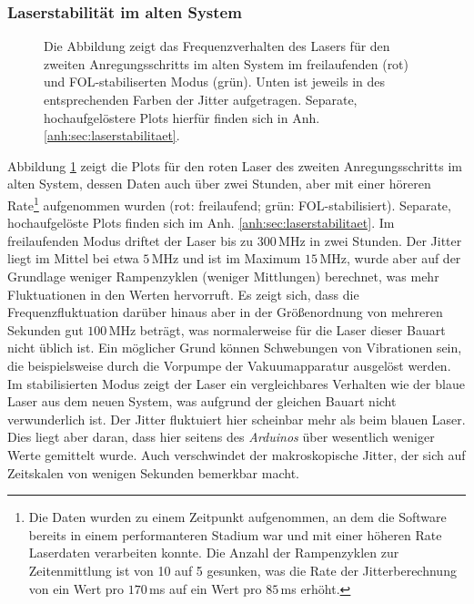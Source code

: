 \subsubsection{Laserstabilität im alten
System}\label{subsubsec:stabilitaetsmessungen_software_altes_system}
\begin{figure}[h]
 	\centering
 	\footnotesize
	
	\caption[Laserfrequenzverhalten altes System]{Die Abbildung zeigt das
	Frequenzverhalten des Lasers für den zweiten Anregungsschritts im alten System
	im freilaufenden (rot) und FOL-stabiliserten Modus (grün).
	Unten ist jeweils in des entsprechenden Farben der Jitter aufgetragen.
	Separate, hochaufgelöstere Plots hierfür finden sich in Anh.
	\ref{anh:sec:laserstabilitaet}.}
	\label{fig:laserstabilitaet_alt_alles}
\end{figure}
Abbildung \ref{fig:laserstabilitaet_alt_alles} zeigt die Plots für den
roten Laser des zweiten Anregungsschritts im alten System, dessen Daten auch
über zwei Stunden, aber mit einer höreren Rate\footnote{Die Daten wurden zu
einem Zeitpunkt aufgenommen, an dem die Software bereits in einem performanteren
Stadium war und mit einer höheren Rate Laserdaten verarbeiten konnte. Die Anzahl
der Rampenzyklen zur Zeitenmittlung ist von 10 auf 5 gesunken, was die Rate
der Jitterberechnung von ein Wert pro $170\,$ms auf ein Wert pro $85\,$ms
erhöht.} aufgenommen wurden (rot:
freilaufend; grün:
FOL-stabilisiert).
Separate, hochaufgelöste Plots finden sich im Anh.
\ref{anh:sec:laserstabilitaet}. Im freilaufenden Modus driftet der Laser bis
zu $300\,$MHz in zwei Stunden. Der Jitter liegt im Mittel bei etwa $5\,$MHz und
ist im Maximum $15\,$MHz, wurde aber auf der Grundlage weniger Rampenzyklen
(weniger Mittlungen) berechnet, was mehr Fluktuationen in den Werten hervorruft.
Es zeigt sich, dass die Frequenzfluktuation darüber hinaus aber in der Größenordnung von mehreren Sekunden gut $100\,$MHz beträgt, was normalerweise für die Laser dieser Bauart
nicht üblich ist. Ein möglicher Grund können Schwebungen von Vibrationen sein,
die beispielsweise durch die Vorpumpe der Vakuumapparatur ausgelöst werden. Im
stabilisierten Modus zeigt der Laser ein vergleichbares Verhalten wie der blaue
Laser aus dem neuen System, was aufgrund der gleichen Bauart nicht verwunderlich ist. Der Jitter fluktuiert hier scheinbar mehr als beim blauen
Laser. Dies liegt aber daran, dass hier seitens des \textit{Arduinos} über
wesentlich weniger Werte gemittelt wurde. Auch verschwindet der makroskopische
Jitter, der sich auf Zeitskalen von wenigen Sekunden bemerkbar macht.\par
